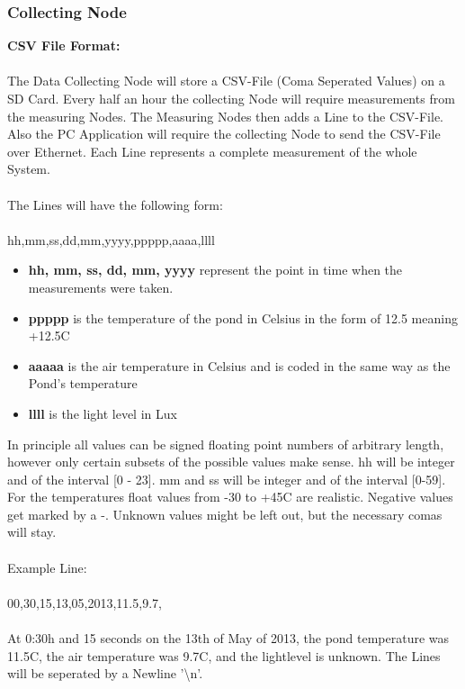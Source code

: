 \documentclass[
	11pt,
	a4paper
]{article}%
\begin{document}
\subsubsection{Collecting Node}
\textbf{CSV File Format:}
\\\\
The Data Collecting Node will store a CSV-File (Coma Seperated Values) on a SD Card. Every half an hour the collecting Node will require measurements from the measuring Nodes. The Measuring Nodes then adds a Line to the CSV-File. Also the PC Application will require the collecting Node to send the CSV-File over Ethernet. Each Line represents a complete measurement of the whole System.
\\\\
The Lines will have the following form:
\\\\
hh,mm,ss,dd,mm,yyyy,ppppp,aaaa,llll
\begin{itemize}
\item \textbf{hh, mm, ss, dd, mm, yyyy} represent the point in time when the measurements were taken.
\item \textbf{ppppp} is the temperature of the pond in \degree Celsius in the form of 12.5 meaning +12.5\degree C
\item \textbf{aaaaa} is the air temperature in \degree Celsius and is coded in the same way as the Pond's temperature
\item \textbf{llll} is the light level in Lux
\end{itemize}
In principle all values can be signed floating point numbers of arbitrary length, however only certain subsets of the possible values make sense. hh will be integer and of the interval [0 - 23]. mm and ss will be integer and of the interval [0-59]. For the temperatures float values from -30 to +45\degree C are realistic. Negative values get marked by a -. Unknown values might be left out, but the necessary comas will stay.
\\\\
Example Line:
\\\\
00,30,15,13,05,2013,11.5,9.7,
\\\\
At 0:30h and 15 seconds on the 13th of May of 2013, the pond temperature was 11.5\degree C, the air temperature was 9.7\degree C, and the lightlevel is unknown. The Lines will be seperated by a Newline '\textbackslash n'.
\\\\
\end{document}
